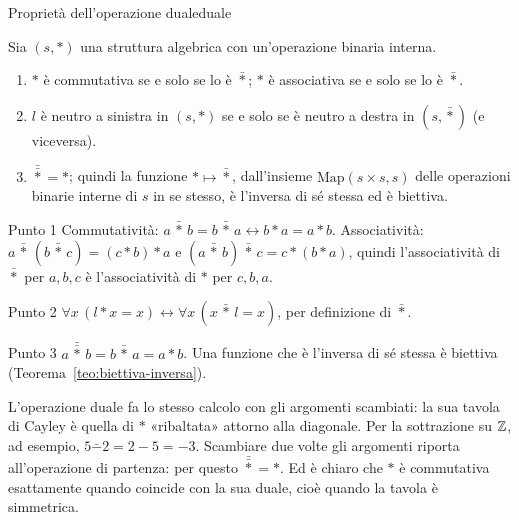 \begin{concetto}
\begin{Proposizione}{Proprietà dell'operazione duale}{duale}
    \begin{prerequisiti}
    \end{prerequisiti}
    Sia $(s, *)$ una struttura algebrica con un'operazione binaria interna.
    \begin{enumerate}
        \item $*$ è commutativa se e solo se lo è $\bar{*}$; $*$ è associativa se e solo se lo è $\bar{*}$.
        \item $l$ è neutro a sinistra in $(s, *)$ se e solo se è neutro a destra in $(s, \bar{*})$ (e viceversa).
        \item $\bar{\bar{*}} = *$; quindi la funzione $* \mapsto \bar{*}$, dall'insieme $\mathrm{Map}(s \times s, s)$ delle operazioni
              binarie interne di $s$ in se stesso, è l'inversa di sé stessa ed è biettiva.
    \end{enumerate}
\end{Proposizione}
\begin{dimostrazione}
    \begin{caso}{Punto 1}
        Commutatività: $a \,\bar{*}\, b = b \,\bar{*}\, a \leftrightarrow b * a = a * b$. Associatività: $a \,\bar{*}\, (b \,\bar{*}\, c) = (c * b) * a$
        e $(a \,\bar{*}\, b) \,\bar{*}\, c = c * (b * a)$, quindi l'associatività di $\bar{*}$ per $a, b, c$ è l'associatività di $*$ per $c, b, a$.
    \end{caso}
    \begin{caso}{Punto 2}
        $\forall x\,(l * x = x) \leftrightarrow \forall x\,(x \,\bar{*}\, l = x)$, per definizione di $\bar{*}$.
    \end{caso}
    \begin{caso}{Punto 3}
        $a \,\bar{\bar{*}}\, b = b \,\bar{*}\, a = a * b$. Una funzione che è l'inversa di sé stessa è biettiva (Teorema~\ref{teo:biettiva-inversa}).
    \end{caso}
\end{dimostrazione}
\end{concetto}

\begin{spiegazione}
    L'operazione duale fa lo stesso calcolo con gli argomenti scambiati: la sua tavola di Cayley è quella di $*$ «ribaltata» attorno alla diagonale.
    Per la sottrazione su $\mathbb{Z}$, ad esempio, $5 \mathbin{\bar{-}} 2 = 2 - 5 = -3$. Scambiare due volte gli argomenti riporta all'operazione di partenza: per questo $\bar{\bar{*}} = *$.
    Ed è chiaro che $*$ è commutativa esattamente quando coincide con la sua duale, cioè quando la tavola è simmetrica.
\end{spiegazione}


